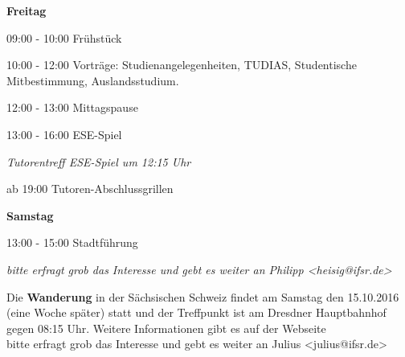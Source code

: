 \documentclass[a4paper,12pt]{report}
\begin{document}
\textbf{Freitag}
\begin{itemize*}
\item 09:00 - 10:00 Frühstück
\item 10:00 - 12:00 Vorträge: Studienangelegenheiten, TUDIAS, Studentische Mitbestimmung, Auslandsstudium.
\item 12:00 - 13:00 Mittagspause
\item 13:00 - 16:00 ESE-Spiel
\begin{itemize*}
  \item \small{\textit{Tutorentreff ESE-Spiel um 12:15 Uhr}}
\end{itemize*}
\item ab 19:00 Tutoren-Abschlussgrillen
\end{itemize*}

\textbf{Samstag}
\begin{itemize*}
\item 13:00 - 15:00 Stadtführung
\begin{itemize*}
  \item \small{\textit{bitte erfragt grob das Interesse und gebt es weiter an Philipp <heisig@ifsr.de>}}
\end{itemize*}
\end{itemize*}

Die \textbf{Wanderung} in der Sächsischen Schweiz findet am Samstag den 15.10.2016 (eine Woche später) statt und der Treffpunkt ist am  Dresdner Hauptbahnhof gegen 08:15 Uhr. Weitere Informationen gibt es auf der Webseite\\ bitte erfragt grob das Interesse und gebt es weiter an Julius <julius@ifsr.de>
\end{document}
